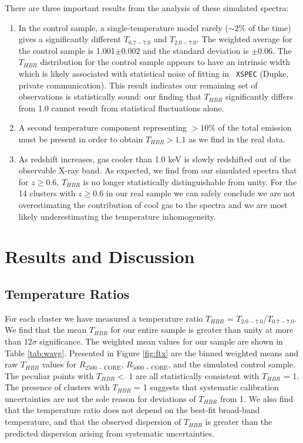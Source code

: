 \documentclass{emulateapj}
\begin{document}
There are three important results from the analysis of these simulated
spectra:
\begin{enumerate}
\item In the control sample, a single-temperature model rarely
($\sim 2\%$ of the time) gives a significantly different $T_{0.7-7.0}$ and
$T_{2.0-7.0}$. The weighted average for the control sample is 1.001$\pm
0.002$ and the standard deviation is $\pm0.06$. The $T_{HBR}$
distribution for the control sample appears to have an intrinsic width
which is likely associated with statistical noise of fitting in {\tt
XSPEC} (Dupke, private communication). This result indicates our
remaining set of observations is statistically sound: our finding that
$T_{HBR}$ significantly differs from 1.0 cannot result from
statistical fluctuations alone.
\item A second temperature component representing $> 10\%$ of the total
emission must be present in order to obtain $T_{HBR} > 1.1$ as we find
in the real data.
\item As redshift increases, gas cooler than 1.0 keV is slowly
redshifted out of the observable X-ray band. As expected, we find from
our simulated spectra that for $z \geq 0.6$, $T_{HBR}$ is no longer
statistically distinguishable from unity. For the 14 clusters with $z
\geq 0.6$ in our real sample we can safely conclude we are not
overestimating the contribution of cool gas to the spectra and we are
most likely underestimating the temperature inhomogeneity.
\end{enumerate}

\section{Results and Discussion} \label{sec:r&d}

\subsection{Temperature Ratios} \label{sec:tfresults}

For each cluster we have measured a temperature ratio $T_{HBR}$ =
$T_{2.0-7.0}$/$T_{0.7-7.0}$. We find that the mean $T_{HBR}$ for our
entire sample is greater than unity at more than $12\sigma$
significance. The weighted mean values for our sample are shown in
Table \ref{tab:wavg}. Presented in Figure  \ref{fig:ftx} are the binned
weighted means and raw $T_{HBR}$ values for $R_{2500-\mathrm{CORE}}$,
$R_{5000-\mathrm{CORE}}$, and the simulated control sample. The peculiar
points with $T_{HBR} <$ 1 are all statistically consistent with
$T_{HBR}$ = 1. The presence of clusters with $T_{HBR}$ = 1 suggests
that systematic calibration uncertainties are not the sole reason for
deviations of $T_{HBR}$ from 1. We also find that the temperature
ratio does not depend on the best-fit broad-band temperature, and that
the observed dispersion of $T_{HBR}$ is greater than the predicted
dispersion arising from systematic uncertainties.
\end{document}
